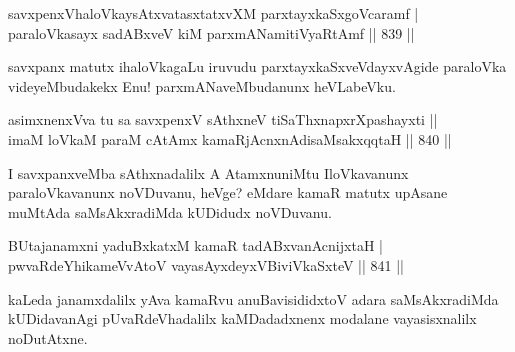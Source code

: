 \begin{shl}
savxpenxVhaloVkaysAtxvatasxtatxvXM parxtayxkaSxgoVcaramf | \\
paraloVkasayx sadABxveV kiM parxmANamitiVyaRtAmf \hfill||  839 ||  
\end{shl}

\begin{artha}
savxpanx matutx ihaloVkagaLu iruvudu parxtayxkaSxveVdayxvAgide paraloVka videyeMbudakekx Enu! parxmANaveMbudanunx heVLabeVku.
\end{artha}


\begin{shl}
asimxnenxVva tu sa savxpenxV sAthxneV tiSaThxnapxrXpashayxti ||  \\
imaM loVkaM paraM cA\s \s tAmx kamaRjAcnxnAdisaMsakxqqtaH \hfill||  840 ||  
\end{shl}

\begin{artha}
I savxpanxveMba sAthxnadalilx A AtamxnuniMtu IloVkavanunx paraloVkavanunx noVDuvanu, heVge? eMdare kamaR matutx upAsane muMtAda saMsAkxradiMda kUDidudx noVDuvanu.
\end{artha}


\begin{shl}
\footnotemark[1]BUtajanamxni yaduBxkatxM kamaR tadABxvanAcnijxtaH | \\
pwvaRdeYhikameVvAtoV vayasAyxdeyxV\s BiviVkaSxteV \hfill||  841 ||  
\end{shl}

\begin{artha}
kaLeda janamxdalilx yAva kamaRvu anuBavisididxtoV adara saMsAkxradiMda kUDidavanAgi pUvaRdeVhadalilx kaMDadadxnenx modalane vayasisxnalilx noDutAtxne.
\end{artha}

